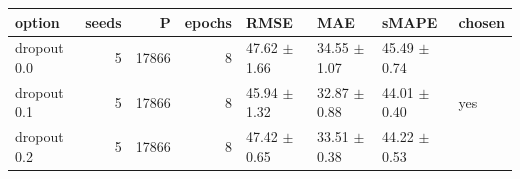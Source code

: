 \begin{tabular}{lrrrllll}
\toprule
option & seeds & P & epochs & RMSE & MAE & sMAPE & chosen \\
\midrule
dropout 0.0 & 5 & 17866 & 8 & 47.62 $\pm$ 1.66 & 34.55 $\pm$ 1.07 & 45.49 $\pm$ 0.74 &  \\
dropout 0.1 & 5 & 17866 & 8 & 45.94 $\pm$ 1.32 & 32.87 $\pm$ 0.88 & 44.01 $\pm$ 0.40 & yes \\
dropout 0.2 & 5 & 17866 & 8 & 47.42 $\pm$ 0.65 & 33.51 $\pm$ 0.38 & 44.22 $\pm$ 0.53 &  \\
\bottomrule
\end{tabular}
